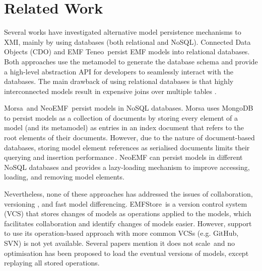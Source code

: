 \documentclass{llncs}
\begin{document}

\section{Related Work}
\label{sec:related_work}
Several works have investigated alternative model persistence mechanisms to XMI, mainly by using databases (both relational and NoSQL). Connected Data Objects (CDO) \cite{eclipse2017cdo} and EMF Teneo\,\cite{eclipse2017teneo} persist EMF models into relational databases. Both approaches use the metamodel to generate the database schema and provide a high-level abstraction API for developers to seamlessly interact with the databases. The main drawback of using relational databases is that highly interconnected models result in expensive joins over multiple tables \cite{barmpis2014evaluation}. 

Morsa\,\cite{pagan2011morsa} and NeoEMF\,\cite{daniel2016neoemf} persist models in NoSQL databases.
Morsa uses MongoDB\,\cite{mongodb2017what} to persist models as a collection of documents by storing every element of a model (and its metamodel) as entries in an index document that refers to the root elements of their documents.%
However, due to the nature of document-based databases, storing model element references as serialised documents limits their querying and insertion performance\,\cite{barmpis2014evaluation}.
NeoEMF can persist models in different NoSQL databases and provides a lazy-loading mechanism to improve accessing, loading, and removing model elements.

Nevertheless, none of these approaches has addressed the issues of collaboration, versioning , and fast model differencing.
EMFStore\,\cite{koegel2010emfstore} is a version control system (VCS) that stores changes of models as operations applied to the models, which facilitates collaboration and identify changes of models easier.
However, support to use its operation-based approach with more common VCSs (e.g. GitHub, SVN) is not yet available. Several papers mention it does not scale\,\cite{pagan2011morsa,kolovos2013research} and no optimisation has been proposed to load the eventual versions of models, except replaying all stored operations. 
\end{document}
